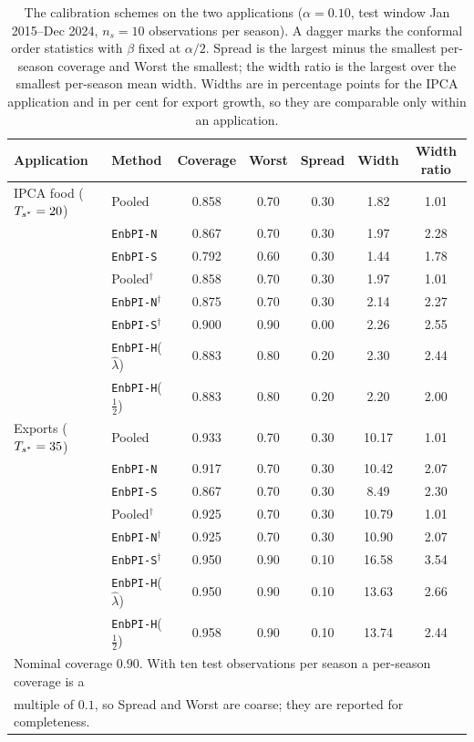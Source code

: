 \begin{table}[ht]
\centering
\small
\setlength{\tabcolsep}{4pt}
\caption{The calibration schemes on the two applications
         ($\alpha = 0.10$, test window Jan 2015--Dec 2024,
         $n_s = 10$ observations per season).  A dagger marks the
         conformal order statistics with $\beta$ fixed at
         $\alpha/2$.  Spread is the largest minus the smallest
         per-season coverage and Worst the smallest; the width ratio
         is the largest over the smallest per-season mean width.
         Widths are in percentage points for the IPCA application
         and in per cent for export growth, so they are comparable
         only within an application.}
\label{tab:empirical_family}
\begin{tabular}{l l ccc cc}
\toprule
Application & Method & Coverage & Worst & Spread & Width & Width ratio \\
\midrule
IPCA food ($T_{s^*} = 20$) & Pooled & 0.858 & 0.70 & 0.30 & 1.82 & 1.01 \\
 & \texttt{EnbPI-N} & 0.867 & 0.70 & 0.30 & 1.97 & 2.28 \\
 & \texttt{EnbPI-S} & 0.792 & 0.60 & 0.30 & 1.44 & 1.78 \\
 & Pooled$^\dagger$ & 0.858 & 0.70 & 0.30 & 1.97 & 1.01 \\
 & \texttt{EnbPI-N}$^\dagger$ & 0.875 & 0.70 & 0.30 & 2.14 & 2.27 \\
 & \texttt{EnbPI-S}$^\dagger$ & 0.900 & 0.90 & 0.00 & 2.26 & 2.55 \\
 & \texttt{EnbPI-H}($\hat\lambda$) & 0.883 & 0.80 & 0.20 & 2.30 & 2.44 \\
 & \texttt{EnbPI-H}($\tfrac12$) & 0.883 & 0.80 & 0.20 & 2.20 & 2.00 \\
\midrule
Exports ($T_{s^*} = 35$) & Pooled & 0.933 & 0.70 & 0.30 & 10.17 & 1.01 \\
 & \texttt{EnbPI-N} & 0.917 & 0.70 & 0.30 & 10.42 & 2.07 \\
 & \texttt{EnbPI-S} & 0.867 & 0.70 & 0.30 & 8.49 & 2.30 \\
 & Pooled$^\dagger$ & 0.925 & 0.70 & 0.30 & 10.79 & 1.01 \\
 & \texttt{EnbPI-N}$^\dagger$ & 0.925 & 0.70 & 0.30 & 10.90 & 2.07 \\
 & \texttt{EnbPI-S}$^\dagger$ & 0.950 & 0.90 & 0.10 & 16.58 & 3.54 \\
 & \texttt{EnbPI-H}($\hat\lambda$) & 0.950 & 0.90 & 0.10 & 13.63 & 2.66 \\
 & \texttt{EnbPI-H}($\tfrac12$) & 0.958 & 0.90 & 0.10 & 13.74 & 2.44 \\
\bottomrule
\multicolumn{7}{l}{\footnotesize Nominal coverage $0.90$.  With ten test observations per season a per-season coverage is a}\\
\multicolumn{7}{l}{\footnotesize multiple of $0.1$, so Spread and Worst are coarse; they are reported for completeness.}\\
\end{tabular}
\end{table}
